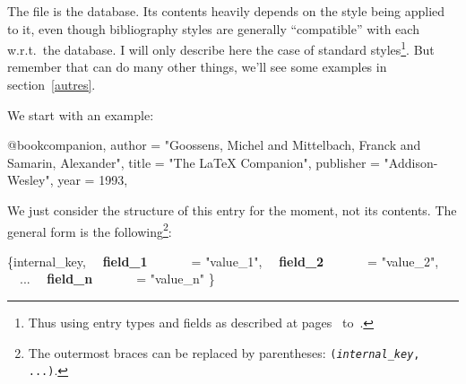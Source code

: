 %
% 
% 


\label{part3}
\parttoc
\mtcskip

The  file is the database. Its contents heavily
depends on the style being applied to it, even though 
bibliography styles are generally ``compatible'' with each w.r.t.\ the
database. I will only describe here
the case of standard styles\footnote{Thus using entry types
and fields as described at pages~\pageref{champ} 
to~\pageref{fin-champ}.}. 
But remember that
\bt can do many other things, we'll see some examples in
section~\ref{autres}. 


We start with  an example:

\begin{verbatimtab}
@book{companion,
  author 	= "Goossens, Michel and Mittelbach, Franck and Samarin, Alexander",
  title 	= "The {{\LaTeX}} {C}ompanion",
  publisher 	= "Addison-Wesley",
  year 		= 1993,
}
\end{verbatimtab}
We just consider the structure of this entry for the moment, not its
contents. The general form is the following\footnote{The 
outermost braces can be replaced by parentheses: 
 \texttt{({\itshape internal\_key}, ...)}.}:
\bigskip

\noindent\begin{minipage}{\textwidth}
\obeylines
\ttfamily {}\{internal\_key, 
\ \ {\bfseries field\_1}\ \ \ \ \ \ \ = "value\_1",
\ \ {\bfseries field\_2}\ \ \ \ \ \ \ = "value\_2",
\ \ ...
\ \ {\bfseries field\_n}\ \ \ \ \ \ \ = "value\_n"
\}
\end{minipage}

